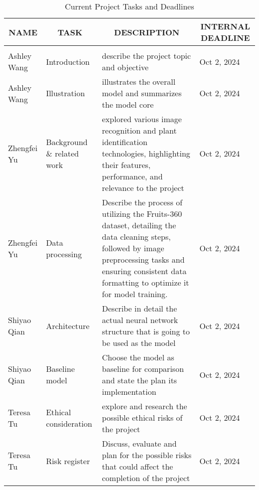 \documentclass{article} %
\begin{document}
\begin{table}[hp]
\caption{Current Project Tasks and Deadlines}
\label{sample-table}
\vspace{0.5cm}
\begin{tabular}{p{0.75in}p{1.25in}p{2.25in}p{1.25in}}
\multicolumn{1}{c}{\bf NAME}  &\multicolumn{1}{c}{\bf TASK} &\multicolumn{1}{c}{\bf DESCRIPTION} &\multicolumn{1}{c}{\bf INTERNAL DEADLINE}
\\ \hline \\
Ashley Wang &Introduction  &describe the project topic and objective &Oct 2, 2024 \\
Ashley Wang &Illustration  &illustrates the overall model and summarizes the model core  &Oct 2, 2024\\
Zhengfei Yu   &Background \& related work   &explored various image recognition and plant identification technologies, highlighting their features, performance, and relevance to the project    &Oct 2, 2024\\
Zhengfei Yu   &Data processing  &Describe the process of utilizing the Fruits-360 dataset, detailing the data cleaning steps, followed by image preprocessing tasks and ensuring consistent data formatting to optimize it for model training. &Oct 2, 2024\\
Shiyao Qian  &Architecture  &Describe in detail the actual neural network structure that is going to be used as the model &Oct 2, 2024\\
Shiyao Qian  &Baseline model  &Choose the model as baseline for comparison and state the plan its implementation  &Oct 2, 2024\\
Teresa Tu  &Ethical consideration  &explore and research the possible ethical risks of the project &Oct 2, 2024\\
Teresa Tu  &Risk register  &Discuss, evaluate and plan for the possible risks that could affect the completion of the project  &Oct 2, 2024\\
\end{tabular}
\end{table}
\end{document}
